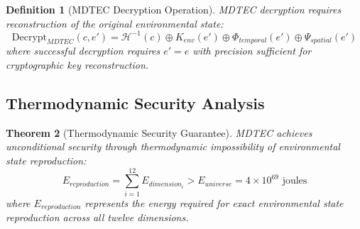 \documentclass[12pt,a4paper]{article}
\newtheorem{theorem}{Theorem}
\newtheorem{definition}[theorem]{Definition}
\begin{document}
\begin{definition}[MDTEC Decryption Operation]
MDTEC decryption requires reconstruction of the original environmental state:
\begin{equation}
\text{Decrypt}_{MDTEC}(c, e') = \mathcal{H}^{-1}(c) \oplus K_{env}(e') \oplus \Phi_{temporal}(e') \oplus \Psi_{spatial}(e')
\end{equation}
where successful decryption requires $e' = e$ with precision sufficient for cryptographic key reconstruction.
\end{definition}

\subsection{Thermodynamic Security Analysis}

\begin{theorem}[Thermodynamic Security Guarantee]
MDTEC achieves unconditional security through thermodynamic impossibility of environmental state reproduction:
\begin{equation}
E_{reproduction} = \sum_{i=1}^{12} E_{dimension_i} > E_{universe} = 4 \times 10^{69} \text{ joules}
\end{equation}
where $E_{reproduction}$ represents the energy required for exact environmental state reproduction across all twelve dimensions.
\end{theorem}
\end{document}
